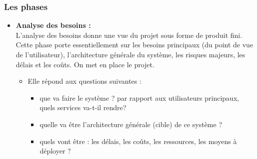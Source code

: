\documentclass[12 pt]{report}
\begin{document}
\subsubsection{Les phases }
\begin{itemize}[font=\color{black} \Large, label=]
\item \textbf{Analyse des besoins :}
\\
L'analyse des besoins donne une vue du projet sous forme de produit fini. Cette phase porte essentiellement sur les besoins principaux (du point de vue de l'utilisateur), l'architecture générale du système, les risques majeurs, les délais et les coûts. On met en place le projet.

\begin{itemize}[font=\color{black} \Large, label=]
\item Elle répond aux questions suivantes :
\begin{itemize}[font=\color{black} \Large, label=]
\item que va faire le système ? par rapport aux utilisateurs principaux, quels services va-t-il rendre?
\item quelle va être l'architecture générale (cible) de ce système ?
\item quels vont être : les délais, les coûts, les ressources, les moyens à déployer ?
\end{itemize}
\end{itemize}

\end{itemize}
\end{document}
